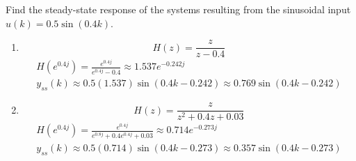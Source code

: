 \documentclass[12pt]{article}
\newenvironment{problem}[2][Problem]{\begin{trivlist}
\item[\hskip \labelsep {\bfseries #1}\hskip \labelsep {\bfseries #2.}]}{\end{trivlist}}
\begin{document}
\pagebreak
\begin{problem}{5}
    Find the steady-state response of the systems resulting from the
    sinusoidal input $u(k) = 0.5 \sin(0.4 k)$.
    \begin{enumerate}[label=\alph*.]
        \item $$H(z) = \frac{z}{z-0.4}$$
        \begin{align*}
            H(e^{0.4j}) = \frac{e^{0.4j}}{e^{0.4j}-0.4} \approx 1.537e^{-0.242j}\\
            y_{ss}(k)\approx 0.5(1.537)\sin(0.4k-0.242) \approx 0.769\sin(0.4k-0.242)
        \end{align*} 
        \item $$H(z) = \frac{z}{z^2+0.4z+0.03}$$
        \begin{align*}
            H(e^{0.4j}) = \frac{e^{0.4j}}{e^{0.8j}+0.4e^{0.4j}+0.03} \approx 0.714e^{-0.273j}\\
            y_{ss}(k)\approx 0.5(0.714)\sin(0.4k-0.273) \approx 0.357\sin(0.4k-0.273)
        \end{align*}
    \end{enumerate}
\end{problem}
 
\end{document}
